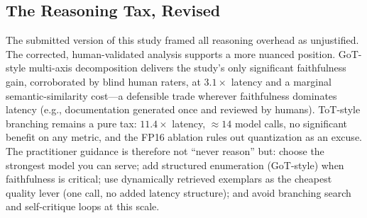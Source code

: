 \documentclass[pdflatex,sn-mathphys-ay]{sn-jnl}%
\theoremstyle{thmstyleone}%
\theoremstyle{thmstyletwo}%
\theoremstyle{thmstylethree}%
\begin{document}
{\subsection{The Reasoning Tax, Revised}
The submitted version of this study framed all reasoning overhead as unjustified. The corrected, human-validated analysis supports a more nuanced position. GoT-style multi-axis decomposition delivers the study's only significant faithfulness gain, corroborated by blind human raters, at $3.1\times$ latency and a marginal semantic-similarity cost---a defensible trade wherever faithfulness dominates latency (e.g., documentation generated once and reviewed by humans). ToT-style branching remains a pure tax: $11.4\times$ latency, ${\approx}14$ model calls, no significant benefit on any metric, and the FP16 ablation rules out quantization as an excuse. The practitioner guidance is therefore not ``never reason'' but: choose the strongest model you can serve; add structured enumeration (GoT-style) when faithfulness is critical; use dynamically retrieved exemplars as the cheapest quality lever (one call, no added latency structure); and avoid branching search and self-critique loops at this scale.


}
\end{document}
